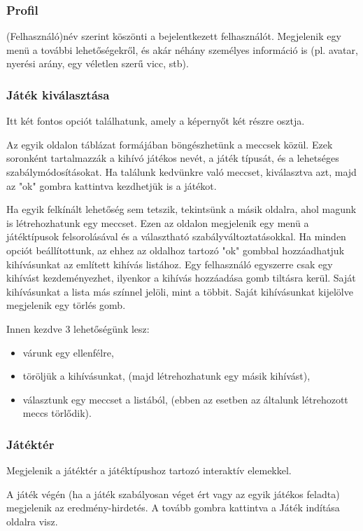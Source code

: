 \subsubsection{Profil}
(Felhasználó)név szerint köszönti a bejelentkezett felhasználót. Megjelenik egy menü a további lehetőségekről, és akár néhány személyes információ is (pl. avatar, nyerési arány, egy véletlen szerű vicc, stb).

\subsubsection{Játék kiválasztása}
Itt két fontos opciót találhatunk, amely a képernyőt két részre osztja.

Az egyik oldalon táblázat formájában böngészhetünk a meccsek közül. Ezek soronként tartalmazzák a kihívó játékos nevét, a játék típusát, és a lehetséges szabálymódosításokat. Ha találunk kedvünkre való meccset, kiválasztva azt, majd az "ok" gombra kattintva kezdhetjük is a játékot.

Ha egyik felkínált lehetőség sem tetszik, tekintsünk a másik oldalra, ahol magunk is létrehozhatunk egy meccset. Ezen az oldalon megjelenik egy menü a játéktípusok felsorolásával és a választható szabályváltoztatásokkal. Ha minden opciót beállítottunk, az ehhez az oldalhoz tartozó "ok" gombbal hozzáadhatjuk kihívásunkat az említett kihívás listához. Egy felhasználó egyszerre csak egy kihívást kezdeményezhet, ilyenkor a kihívás hozzáadása gomb tiltásra kerül. Saját kihívásunkat a lista más színnel jelöli, mint a többit. Saját kihívásunkat kijelölve megjelenik egy törlés gomb. 

Innen kezdve 3 lehetőségünk lesz:
\begin{itemize}
	\item várunk egy ellenfélre,
	\item töröljük a kihívásunkat, (majd létrehozhatunk egy másik kihívást),
	\item választunk egy meccset a listából, (ebben az esetben az általunk létrehozott meccs törlődik).
\end{itemize}

\subsubsection{Játéktér}
Megjelenik a játéktér a játéktípushoz tartozó interaktív elemekkel.

A játék végén (ha a játék szabályosan véget ért vagy az egyik játékos feladta) megjelenik az eredmény-hirdetés. A tovább gombra kattintva a Játék indítása oldalra visz.

